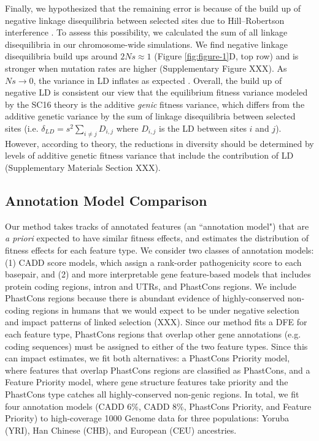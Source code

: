 \documentclass[11pt]{article}
\begin{document}
Finally, we hypothesized that the remaining error is because of the build up of
negative linkage disequilibria between selected sites due to Hill--Robertson
interference \parencite{Hill1966-kd,McVean2000-bt,Comeron2007-wq}. To assess
this possibility, we calculated the sum of all linkage disequilibria in our
chromosome-wide simulations. We find negative linkage disequilibria build ups
around $2Ns \approx 1$ (Figure \ref{fig:figure-1}D, top row) and is stronger
when mutation rates are higher (Supplementary Figure XXX). As $Ns \to 0$, the
variance in LD inflates as expected \parencite{Ohta1969-ae,Hill1968-ue}.
Overall, the build up of negative LD is consistent our view that the
equilibrium fitness variance modeled by the SC16 theory is the additive
\emph{genic} fitness variance, which differs from the additive genetic variance
by the sum of linkage disequilibria between selected sites (i.e. $\delta_{LD} =
s^2 \sum_{i\ne j} D_{i,j}$ where $D_{i,j}$ is the LD between sites $i$ and
$j$). However, according to theory, the reductions in diversity should be
determined by levels of additive genetic fitness variance that include the
contribution of LD (Supplementary Materials Section XXX).

\subsection*{Annotation Model Comparison}

Our method takes tracks of annotated features (an ``annotation model") that are
\emph{a priori} expected to have similar fitness effects, and estimates the
distribution of fitness effects for each feature type. We consider two classes
of annotation models: (1) CADD score models, which assign a rank-order
pathogenicity score to each basepair, and (2) and more interpretable gene
feature-based models that includes protein coding regions, intron and UTRs, and
PhastCons regions. We include PhastCons regions because there is abundant
evidence of highly-conserved non-coding regions in humans that we would expect
to be under negative selection and impact patterns of linked selection (XXX).
Since our method fits a DFE for each feature type, PhastCons regions that
overlap other gene annotations (e.g. coding sequences) must be assigned to
either of the two feature types. Since this can impact estimates, we fit both
alternatives: a PhastCons Priority model, where features that overlap PhastCons
regions are classified as PhastCons, and a Feature Priority model, where gene
structure features take priority and the PhastCons type catches all
highly-conserved non-genic regions. In total, we fit four annotation models
(CADD 6\%, CADD 8\%, PhastCons Priority, and Feature Priority) to high-coverage
1000 Genome data for three populations: Yoruba (YRI), Han Chinese (CHB), and
European (CEU) ancestries.
\end{document}
